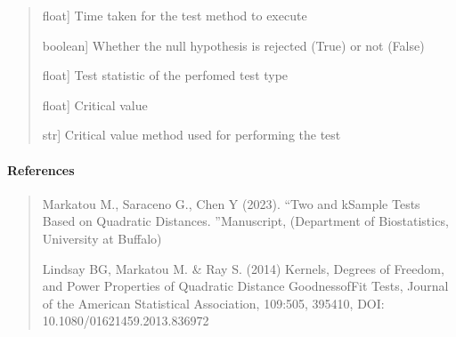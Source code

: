\documentclass[letterpaper,10pt,english,openany,oneside]{sphinxmanual}
\begin{document}
\begin{fulllineitems}
\begin{quote}
\begin{description}
\sphinxlineitem{execution\_time}{[}float{]}
\sphinxAtStartPar
Time taken for the test method to execute

\sphinxlineitem{h0\_rejected\_}{[}boolean{]}
\sphinxAtStartPar
Whether the null hypothesis is rejected (True) or not (False)

\sphinxlineitem{test\_statistic\_}{[}float{]}
\sphinxAtStartPar
Test statistic of the perfomed test type

\sphinxlineitem{cv\_}{[}float{]}
\sphinxAtStartPar
Critical value

\sphinxlineitem{cv\_method\_}{[}str{]}
\sphinxAtStartPar
Critical value method used for performing the test

\end{description}
\end{quote}


\paragraph{References}
\label{\detokenize{api_reference/generated/QuadratiK.kernel_test.KernelTest:references}}\begin{quote}

\sphinxAtStartPar
Markatou M., Saraceno G., Chen Y (2023). “Two\sphinxhyphen{} and k\sphinxhyphen{}Sample Tests Based on Quadratic Distances.
”Manuscript, (Department of Biostatistics, University at Buffalo)

\sphinxAtStartPar
Lindsay BG, Markatou M. \& Ray S. (2014) Kernels, Degrees of Freedom, and 
Power Properties of Quadratic Distance Goodness\sphinxhyphen{}of\sphinxhyphen{}Fit Tests, Journal of the American Statistical
Association, 109:505, 395\sphinxhyphen{}410, DOI: 10.1080/01621459.2013.836972
\end{quote}



\end{fulllineitems}
\end{document}
